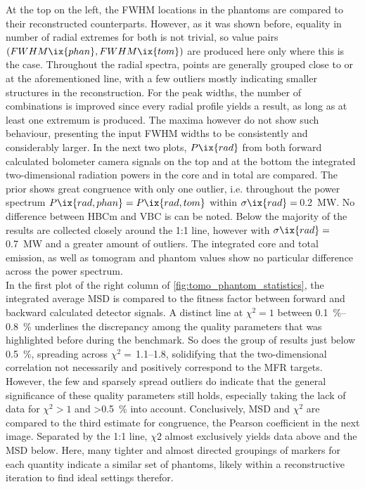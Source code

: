             At the top on the left, the FWHM locations in the phantoms are compared to their reconstructed counterparts. However, as it was shown before, equality in number of radial extremes for both is not trivial, so value pairs $\left(FWHM\ix{phan}, FWHM\ix{tom}\right)$ are produced here only where this is the case. Throughout the radial spectra, points are generally grouped close to or at the aforementioned line, with a few outliers mostly indicating smaller structures in the reconstruction. For the peak widths, the number of combinations is improved since every radial profile yields a result, as long as at least one extremum is produced. The maxima however do not show such behaviour, presenting the input FWHM widths to be consistently and considerably larger. In the next two plots, $P\ix{rad}$ from both forward calculated bolometer camera signals on the top and at the bottom the integrated two-dimensional radiation powers in the core and in total are compared. The prior shows great congruence with only one outlier, i.e. throughout the power spectrum $P\ix{rad,phan}=P\ix{rad,tom}$ within $\sigma\ix{rad}=$\,\SI{0.2}{\mega\watt}. No difference between HBCm and VBC is can be noted. Below the majority of the results are collected closely around the 1:1 line, however with $\sigma\ix{rad}=$\,\SI{0.7}{\mega\watt} and a greater amount of outliers. The integrated core and total emission, as well as tomogram and phantom values show no particular difference across the power spectrum.\\%
            In the first plot of the right column of \cref{fig:tomo_phantom_statistics}, the integrated average MSD is compared to the fitness factor between forward and backward calculated detector signals. A distinct line at $\chi^{2}=1$ between \SIrange{0.1}{0.8}{\percent} underlines the discrepancy among the quality parameters that was highlighted before during the benchmark. So does the group of results just below \SI{0.5}{\percent}, spreading across $\chi^{2}=$\,\SIrange{1.1}{1.8}{\arbitraryunit}, solidifying that the two-dimensional correlation not necessarily and positively correspond to the MFR targets. However, the few and sparsely spread outliers do indicate that the general significance of these quality parameters still holds, especially taking the lack of data for $\chi^{2}>1$ and >\SI{0.5}{\percent} into account. Conclusively, MSD and $\chi^{2}$ are compared to the third estimate for congruence, the Pearson coefficient in the next image. Separated by the 1:1 line, $\chi{2}$ almost exclusively yields data above and the MSD below. Here, many tighter and almost directed groupings of markers for each quantity indicate a similar set of phantoms, likely within a reconstructive iteration to find ideal settings therefor.\\%
